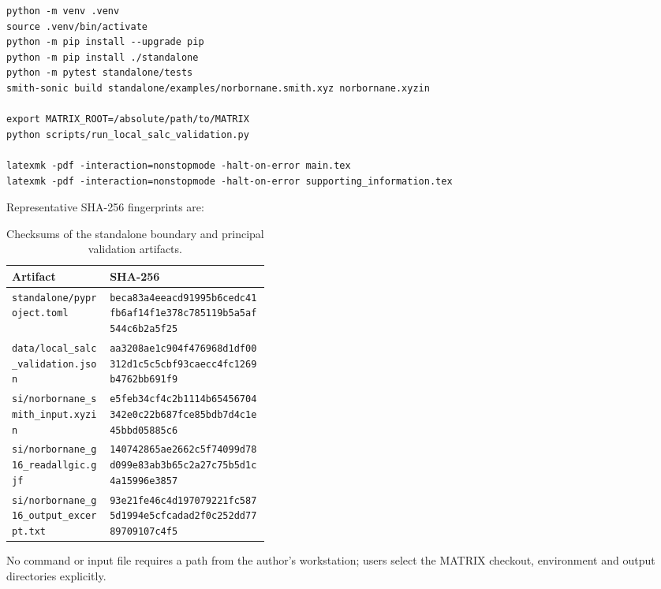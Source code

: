 \documentclass[10pt]{article}
\begin{document}
\begin{lstlisting}
python -m venv .venv
source .venv/bin/activate
python -m pip install --upgrade pip
python -m pip install ./standalone
python -m pytest standalone/tests
smith-sonic build standalone/examples/norbornane.smith.xyz norbornane.xyzin

export MATRIX_ROOT=/absolute/path/to/MATRIX
python scripts/run_local_salc_validation.py

latexmk -pdf -interaction=nonstopmode -halt-on-error main.tex
latexmk -pdf -interaction=nonstopmode -halt-on-error supporting_information.tex
\end{lstlisting}

Representative SHA-256 fingerprints are:

\begin{table}[htbp]
\centering
\scriptsize
\caption{Checksums of the standalone boundary and principal validation artifacts.}
\begin{tabularx}{\linewidth}{@{}p{0.38\linewidth}X@{}}
\toprule
Artifact & SHA-256 \\
\midrule
\texttt{standalone/pyproject.toml} & \nolinkurl{beca83a4eeacd91995b6cedc41fb6af14f1e378c785119b5a5af544c6b2a5f25} \\
\texttt{data/local\_salc\_validation.json} & \nolinkurl{aa3208ae1c904f476968d1df00312d1c5c5cbf93caecc4fc1269b4762bb691f9} \\
\texttt{si/norbornane\_smith\_input.xyzin} & \nolinkurl{e5feb34cf4c2b1114b65456704342e0c22b687fce85bdb7d4c1e45bbd05885c6} \\
\texttt{si/norbornane\_g16\_readallgic.gjf} & \nolinkurl{140742865ae2662c5f74099d78d099e83ab3b65c2a27c75b5d1c4a15996e3857} \\
\texttt{si/norbornane\_g16\_output\_excerpt.txt} & \nolinkurl{93e21fe46c4d197079221fc5875d1994e5cfcadad2f0c252dd7789709107c4f5} \\
\bottomrule
\end{tabularx}
\end{table}

No command or input file requires a path from the author's workstation; users
select the MATRIX checkout, environment and output directories explicitly.
\end{document}
